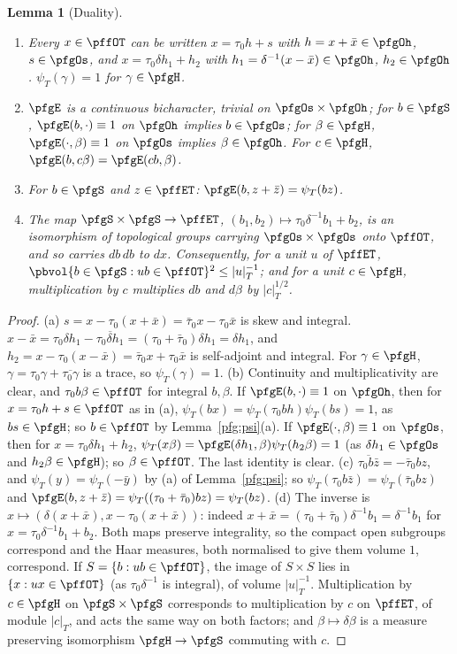 \documentclass[10pt]{amsart}
\newtheorem{lemma}[theorem]{Lemma}
\theoremstyle{definition}
\theoremstyle{remark}
\begin{document}
\begin{lemma}[Duality]\label{pfg:duality}
\begin{enumerate}
\item[(a)] Every $x\in\pffOT$ can be written $x=\tau_0h+s$ with $h=x+\bar x\in\pfgOh$, $s\in\pfgOs$, and
$x=\tau_0\delta h_1+h_2$ with $h_1=\delta^{-1}(x-\bar x)\in\pfgOh$, $h_2\in\pfgOh$. $\psi_T(\gamma)=1$ for
$\gamma\in\pfgH$.
\item[(b)] $\pfgE$ is a continuous bicharacter, trivial on $\pfgOs\times\pfgOh$; for $b\in\pfgS$, $\pfgE(b,\cdot)\equiv1$
on $\pfgOh$ implies $b\in\pfgOs$; for $\beta\in\pfgH$, $\pfgE(\cdot,\beta)\equiv1$ on $\pfgOs$ implies $\beta\in
\pfgOh$. For $c\in\pfgH$, $\pfgE(b,c\beta)=\pfgE(cb,\beta)$.
\item[(c)] For $b\in\pfgS$ and $z\in\pffET$: $\pfgE(b,z+\bar z)=\psi_T(bz)$.
\item[(d)] The map $\pfgS\times\pfgS\to\pffET$, $(b_1,b_2)\mapsto\tau_0\delta^{-1}b_1+b_2$, is an isomorphism of
topological groups carrying $\pfgOs\times\pfgOs$ onto $\pffOT$, and so carries $db\,db$ to $dx$. Consequently, for
a unit $u$ of $\pffET$, $\pbvol\{b\in\pfgS:ub\in\pffOT\}^2\le|u|_T^{-1}$; and for a unit $c\in\pfgH$,
multiplication by $c$ multiplies $db$ and $d\beta$ by $|c|_T^{1/2}$.
\end{enumerate}
\end{lemma}
\begin{proof}
(a) $s=x-\tau_0(x+\bar x)=\bar\tau_0x-\tau_0\bar x$ is skew and integral. $x-\bar x=\tau_0\delta h_1-
\overline{\tau_0\delta h_1}=(\tau_0+\bar\tau_0)\delta h_1=\delta h_1$, and $h_2=x-\tau_0(x-\bar x)=\bar\tau_0x+\tau_0\bar x$
is self-adjoint and integral. For $\gamma\in\pfgH$, $\gamma=\tau_0\gamma+\overline{\tau_0\gamma}$ is a trace, so
$\psi_T(\gamma)=1$. (b) Continuity and multiplicativity are clear, and $\tau_0b\beta\in\pffOT$ for integral $b,\beta$.
If $\pfgE(b,\cdot)\equiv1$ on $\pfgOh$, then for $x=\tau_0h+s\in\pffOT$ as in (a), $\psi_T(bx)=\psi_T(\tau_0bh)
\psi_T(bs)=1$, as $bs\in\pfgH$; so $b\in\pffOT$ by Lemma~\ref{pfg:psi}(a). If $\pfgE(\cdot,\beta)\equiv1$ on $\pfgOs$, then
for $x=\tau_0\delta h_1+h_2$, $\psi_T(x\beta)=\pfgE(\delta h_1,\beta)\psi_T(h_2\beta)=1$ (as $\delta h_1\in\pfgOs$ and
$h_2\beta\in\pfgH$); so $\beta\in\pffOT$. The last identity is clear. (c) $\overline{\tau_0b\bar z}=-\bar\tau_0bz$, and
$\psi_T(y)=\psi_T(-\bar y)$ by (a) of Lemma~\ref{pfg:psi}; so $\psi_T(\tau_0b\bar z)=\psi_T(\bar\tau_0bz)$ and
$\pfgE(b,z+\bar z)=\psi_T((\tau_0+\bar\tau_0)bz)=\psi_T(bz)$. (d) The inverse is $x\mapsto(\delta(x+\bar x),x-\tau_0(x+
\bar x))$: indeed $x+\bar x=(\tau_0+\bar\tau_0)\delta^{-1}b_1=\delta^{-1}b_1$ for $x=\tau_0\delta^{-1}b_1+b_2$. Both maps
preserve integrality, so the compact open subgroups correspond and the Haar measures, both normalised to give them
volume $1$, correspond. If $S=\{b:ub\in\pffOT\}$, the image of $S\times S$ lies in $\{x:ux\in\pffOT\}$ (as
$\tau_0\delta^{-1}$ is integral), of volume $|u|_T^{-1}$. Multiplication by $c\in\pfgH$ on $\pfgS\times\pfgS$
corresponds to multiplication by $c$ on $\pffET$, of module $|c|_T$, and acts the same way on both factors; and
$\beta\mapsto\delta\beta$ is a measure preserving isomorphism $\pfgH\to\pfgS$ commuting with $c$.
\end{proof}
\end{document}
